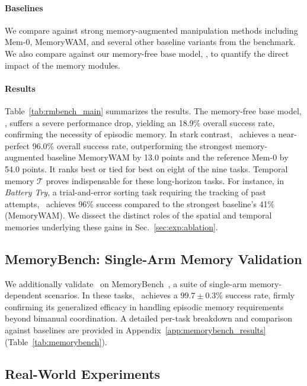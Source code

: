 \paragraph{Baselines} 
We compare against strong memory-augmented manipulation methods including Mem-0, MemoryWAM, and several other baseline variants from the benchmark. We also compare against our memory-free base model, \method, to quantify the direct impact of the memory modules.

\paragraph{Results} 
Table~\ref{tab:rmbench_main} summarizes the results. 
The memory-free base model, \method, suffers a severe performance drop, yielding an 18.9\% overall success rate, confirming the necessity of episodic memory.
In stark contrast, \memmethod\ achieves a near-perfect 96.0\% overall success rate, outperforming the strongest memory-augmented baseline MemoryWAM by 13.0 points and the reference Mem-0 by 54.0 points.
It ranks best or tied for best on eight of the nine tasks.
Temporal memory $\mathcal{T}$ proves indispensable for these long-horizon tasks. For instance, in \emph{Battery Try}, a trial-and-error sorting task requiring the tracking of past attempts, \memmethod\ achieves 96\% success compared to the strongest baseline's 41\% (MemoryWAM).
We dissect the distinct roles of the spatial and temporal memories underlying these gains in Sec.~\ref{sec:exp:ablation}.

\subsection{MemoryBench: Single-Arm Memory Validation}

We additionally validate \memmethod\ on MemoryBench~\cite{fang2025sam2act}, a suite of single-arm memory-dependent scenarios. 
In these tasks, \memmethod\ achieves a $99.7{\pm}0.3\%$ success rate, firmly confirming its generalized efficacy in handling episodic memory requirements beyond bimanual coordination. A detailed per-task breakdown and comparison against baselines are provided in Appendix~\ref{app:memorybench_results} (Table~\ref{tab:memorybench}).

\subsection{Real-World Experiments}
\label{sec:exp:real_world}

